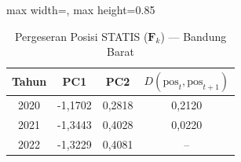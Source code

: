\begin{table}[H]
\centering
\caption{Pergeseran Posisi STATIS ($\mathbf{F}_k$) --- Bandung Barat} \label{tab:sample2jarak_statis_skor_bandung_barat}
\begin{adjustbox}{max width=\textwidth, max height=0.85\textheight}
\begin{tabular}{|c|c|c|c|}
\hline
\textbf{Tahun} & \textbf{PC1} & \textbf{PC2} & \textbf{$D(\text{pos}_t, \text{pos}_{t+1})$} \\
\hline
2020 & -1,1702 & 0,2818 & 0,2120 \\
2021 & -1,3443 & 0,4028 & 0,0220 \\
2022 & -1,3229 & 0,4081 & -- \\
\hline
\end{tabular}
\end{adjustbox}
\end{table}